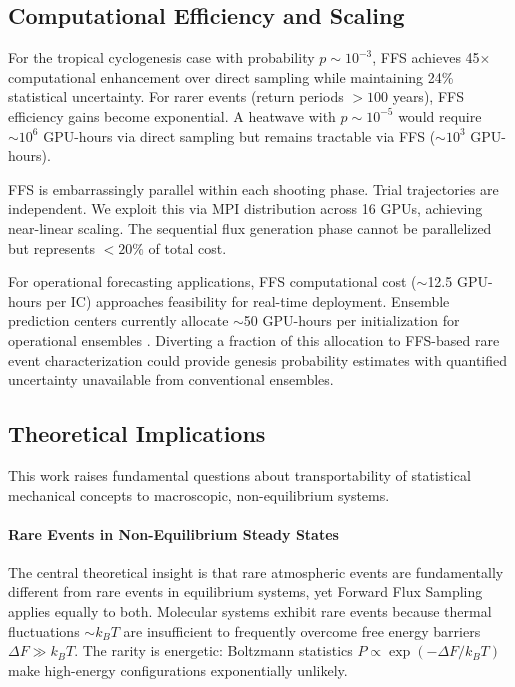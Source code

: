 \documentclass[11pt]{article}
\begin{document}
\subsection{Computational Efficiency and Scaling}

For the tropical cyclogenesis case with probability $p \sim 10^{-3}$, FFS achieves 45$\times$ computational enhancement over direct sampling while maintaining 24\% statistical uncertainty. For rarer events (return periods $> 100$ years), FFS efficiency gains become exponential. A heatwave with $p \sim 10^{-5}$ would require $\sim 10^6$ GPU-hours via direct sampling but remains tractable via FFS ($\sim 10^3$ GPU-hours).

FFS is embarrassingly parallel within each shooting phase. Trial trajectories are independent. We exploit this via MPI distribution across 16 GPUs, achieving near-linear scaling. The sequential flux generation phase cannot be parallelized but represents $<20\%$ of total cost.

For operational forecasting applications, FFS computational cost ($\sim$12.5 GPU-hours per IC) approaches feasibility for real-time deployment. Ensemble prediction centers currently allocate $\sim$50 GPU-hours per initialization for operational ensembles \citep{buizza2018ensemble}. Diverting a fraction of this allocation to FFS-based rare event characterization could provide genesis probability estimates with quantified uncertainty unavailable from conventional ensembles.

\subsection{Theoretical Implications}

This work raises fundamental questions about transportability of statistical mechanical concepts to macroscopic, non-equilibrium systems.

\paragraph{Rare Events in Non-Equilibrium Steady States}
The central theoretical insight is that rare atmospheric events are fundamentally different from rare events in equilibrium systems, yet Forward Flux Sampling applies equally to both. Molecular systems exhibit rare events because thermal fluctuations $\sim k_BT$ are insufficient to frequently overcome free energy barriers $\Delta F \gg k_BT$. The rarity is energetic: Boltzmann statistics $P \propto \exp(-\Delta F/k_BT)$ make high-energy configurations exponentially unlikely.
\end{document}
